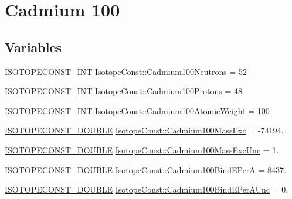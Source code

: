 \hypertarget{group___isotope_const-_cadmium-_cd100}{}\section{Cadmium 100}
\label{group___isotope_const-_cadmium-_cd100}
\subsection*{Variables}
\begin{DoxyCompactItemize}
\item 
\mbox{\hyperlink{group___isotope_const-_macros_ga5f18360b3e99483a35c32d789e62621c}{I\+S\+O\+T\+O\+P\+E\+C\+O\+N\+S\+T\+\_\+\+I\+NT}} \mbox{\hyperlink{group___isotope_const-_cadmium-_cd100_ga27f148f239119cf5a1810e396bb69894}{Isotope\+Const\+::\+Cadmium100\+Neutrons}} = 52
\item 
\mbox{\hyperlink{group___isotope_const-_macros_ga5f18360b3e99483a35c32d789e62621c}{I\+S\+O\+T\+O\+P\+E\+C\+O\+N\+S\+T\+\_\+\+I\+NT}} \mbox{\hyperlink{group___isotope_const-_cadmium-_cd100_gaec461b40ee532d2e0677c6569dcc3e53}{Isotope\+Const\+::\+Cadmium100\+Protons}} = 48
\item 
\mbox{\hyperlink{group___isotope_const-_macros_ga5f18360b3e99483a35c32d789e62621c}{I\+S\+O\+T\+O\+P\+E\+C\+O\+N\+S\+T\+\_\+\+I\+NT}} \mbox{\hyperlink{group___isotope_const-_cadmium-_cd100_gac3bf13d19598dd494f5436a69ea2a501}{Isotope\+Const\+::\+Cadmium100\+Atomic\+Weight}} = 100
\item 
\mbox{\hyperlink{group___isotope_const-_macros_ga8f45a7272ce02c0b4c65c44636ed719a}{I\+S\+O\+T\+O\+P\+E\+C\+O\+N\+S\+T\+\_\+\+D\+O\+U\+B\+LE}} \mbox{\hyperlink{group___isotope_const-_cadmium-_cd100_ga30185b342dbf0d7fed3c3ac3ca6a4028}{Isotope\+Const\+::\+Cadmium100\+Mass\+Exc}} = -\/74194.
\item 
\mbox{\hyperlink{group___isotope_const-_macros_ga8f45a7272ce02c0b4c65c44636ed719a}{I\+S\+O\+T\+O\+P\+E\+C\+O\+N\+S\+T\+\_\+\+D\+O\+U\+B\+LE}} \mbox{\hyperlink{group___isotope_const-_cadmium-_cd100_ga6264c19d9ed5241931515657ad45a727}{Isotope\+Const\+::\+Cadmium100\+Mass\+Exc\+Unc}} = 1.
\item 
\mbox{\hyperlink{group___isotope_const-_macros_ga8f45a7272ce02c0b4c65c44636ed719a}{I\+S\+O\+T\+O\+P\+E\+C\+O\+N\+S\+T\+\_\+\+D\+O\+U\+B\+LE}} \mbox{\hyperlink{group___isotope_const-_cadmium-_cd100_gab692994ee308c223ca56465400955f73}{Isotope\+Const\+::\+Cadmium100\+Bind\+E\+PerA}} = 8437.
\item 
\mbox{\hyperlink{group___isotope_const-_macros_ga8f45a7272ce02c0b4c65c44636ed719a}{I\+S\+O\+T\+O\+P\+E\+C\+O\+N\+S\+T\+\_\+\+D\+O\+U\+B\+LE}} \mbox{\hyperlink{group___isotope_const-_cadmium-_cd100_gafeefd9225a65fc12e2b82108741a6920}{Isotope\+Const\+::\+Cadmium100\+Bind\+E\+Per\+A\+Unc}} = 0.

\end{DoxyCompactItemize}
